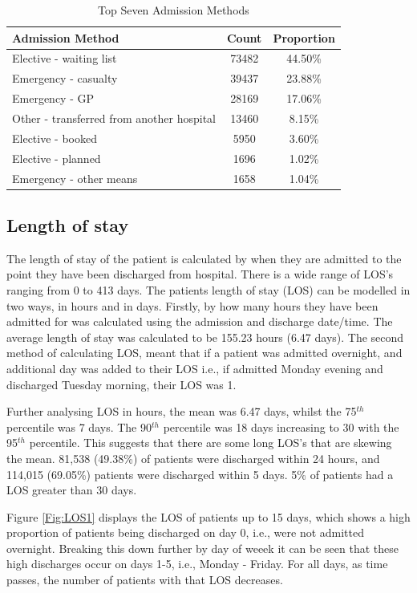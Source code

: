\documentclass[../thesis.tex]{subfiles}
\begin{document}
\begin{table}[H]
    \centering
    \begin{tabular}{lcc}\toprule
    \textbf{Admission Method} & \textbf{Count} &\textbf{Proportion} \\ \midrule
Elective - waiting list& 73482 & 44.50\%\\
Emergency - casualty      &	39437 &23.88\%\\
Emergency - GP          &  	28169&17.06\%\\
Other - transferred from another hospital  & 	13460&8.15\%\\
Elective - booked                  &          	5950 & 3.60\%\\
Elective - planned                &            	1696 & 1.02\%\\
Emergency - other means           &            	1658 & 1.04\%\\

 \bottomrule
    \end{tabular}
    \caption{Top Seven Admission Methods}
    \label{Tab:Admission Method}
\end{table}

\subsection{Length of stay}
The length of stay of the patient is calculated by when they are admitted to the point they have been discharged from hospital. There is a wide range of LOS's ranging from 0 to 413 days. The patients length of stay (LOS) can be modelled in two ways, in hours and in days. Firstly, by how many hours they have been admitted for was calculated using the admission and discharge date/time. The average length of stay was calculated to be 155.23 hours (6.47 days). The second method of calculating LOS, meant that if a patient was admitted overnight, and additional day was added to their LOS i.e., if admitted Monday evening and discharged Tuesday morning, their LOS was 1.

Further analysing LOS in hours, the mean was 6.47 days, whilst the 75$^{th}$ percentile was 7 days. The 90$^{th}$ percentile was 18 days increasing to 30 with the 95$^{th}$ percentile. This suggests that there are some long LOS's that are skewing the mean. 81,538 (49.38\%) of patients were discharged within 24 hours, and 114,015 (69.05\%) patients were discharged within 5 days. 5\% of patients had a LOS greater than 30 days.

Figure \ref{Fig:LOS1} displays the LOS of patients up to 15 days, which shows a high proportion of patients being discharged on day 0, i.e., were not admitted overnight. Breaking this down further by day of weeek it can be seen that these high discharges occur on days 1-5, i.e., Monday - Friday. For all days, as time passes, the number of patients with that LOS decreases. 
\end{document}
